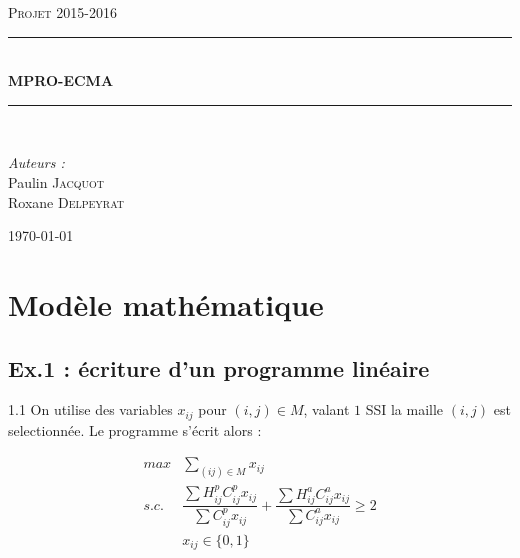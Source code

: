\documentclass[12pt,a4paper]{article}
\newcommand{\reporttitle}{\vspace{3mm} MPRO-ECMA}
\newcommand{\reportauthor}{Paulin \textsc{Jacquot}\\Roxane \textsc{Delpeyrat}}
\newcommand{\reportsubject}{Projet 2015-2016}
\newcommand{\HRule}{\rule{\linewidth}{0.5mm}}
\begin{document}
\begin{titlepage}
	\begin{center}
		\begin{minipage}[c]{0.50\textwidth}
			\begin{flushright}
			\end{flushright}
		\end{minipage}
		\hfill
		\begin{minipage}[c]{0.50\textwidth}
			\begin{flushleft}
			\end{flushleft}
		\end{minipage}
		
		\vspace{2cm}
		
		\textsc{\Large \reportsubject}\\[0.5cm]
		\HRule \\[0.4cm]
		{\huge \bfseries \reporttitle}\\[0.4cm]
		\HRule \\[1.5cm]
		\begin{minipage}[t]{0.35\textwidth}
			\begin{flushleft} \large
				\emph{Auteurs :}\\
					\reportauthor
			\end{flushleft}
		\end{minipage}
		\vfill
		{\large \today}
	\end{center}
\end{titlepage}

\newpage

\tableofcontents

\newpage

\section{Modèle mathématique}
\subsection{Ex.1 : écriture d'un programme linéaire}

1.1 On utilise des variables $x_{ij}$ pour $(i,j) \in M $, valant $1$ SSI la maille $(i,j)$ est selectionnée. Le programme s'écrit alors :

\begin{align}
\label{obj} max & \sum_{(ij)\in M} x_{ij} \\
s.c. \label{critere} \ & \dfrac{\sum H_{ij}^pC_{ij}^p x_{ij}}{\sum C_{ij}^p x_{ij}}+ \dfrac{\sum H_{ij}^a C_{ij}^a x_{ij}}{\sum C_{ij}^a x_{ij}}\geq 2 \\
& x_{ij}\in \{0,1\}
\end{align}
\end{document}
